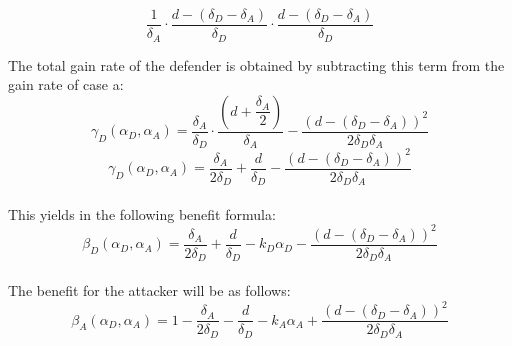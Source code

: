 \begin{equation*}
\dfrac{1} {\delta_{A}} \cdot \dfrac{d - (\delta_{D} - \delta_{A})}{\delta_{D}} \cdot \dfrac{d - (\delta_{D} - \delta_{A})}{\delta_{D}}
\end{equation*}

The total gain  rate of the defender is obtained by subtracting this term from the gain rate of case a:
 \begin{equation*}
\gamma_{D}(\alpha_{D},\alpha_{A}) = \dfrac{\delta_{A}}{\delta_{D}} \cdot \dfrac{(d+\dfrac{\delta_{A}}{2})}{\delta_{A}} - \dfrac{(d - (\delta_{D} - \delta_{A}))^{2}}{2 \delta_{D} \delta_{A}}
\end{equation*}
\begin{equation*}
\gamma_{D}(\alpha_{D},\alpha_{A}) = \dfrac{\delta_{A}}{2\delta_{D}} + \dfrac{d}{\delta_{D}} - \dfrac{(d - (\delta_{D} - \delta_{A}))^{2}}{2 \delta_{D} \delta_{A}}
\end{equation*}\\
This yields in the following benefit formula:
\begin{equation*}
\beta_{D}(\alpha_{D},\alpha_{A}) = \dfrac{\delta_{A}}{2\delta_{D}} + \dfrac{d}{\delta_{D}} - k_{D} \alpha_{D} - \dfrac{(d - (\delta_{D} - \delta_{A}))^{2}}{2 \delta_{D} \delta_{A}}
\end{equation*}\\
 
The benefit for the attacker will be as follows:
\begin{equation*}
\beta_{A}(\alpha_{D},\alpha_{A}) = 1 -\dfrac{\delta_{A}}{2\delta_{D}} - \dfrac{d}{\delta_{D}} - k_{A} \alpha_{A} + \dfrac{(d - (\delta_{D} - \delta_{A}))^{2}}{2 \delta_{D} \delta_{A}}
\end{equation*}\\


